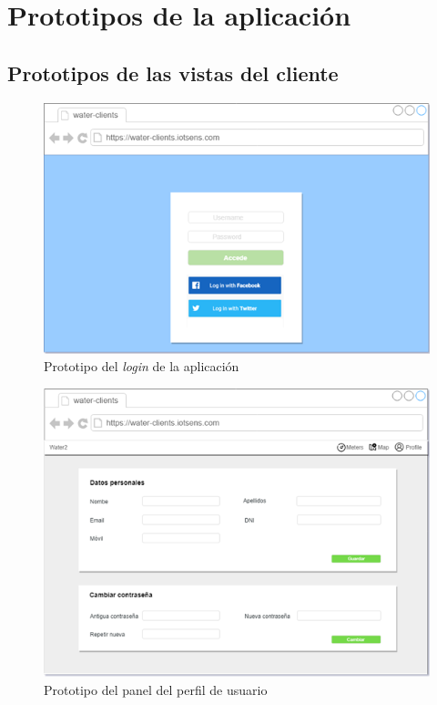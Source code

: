 \documentclass[pdftex,11pt,a4paper]{book}
\begin{document}
\appendix
\renewcommand\appendixname{Anexo}



\chapter{Prototipos de la aplicación}

\section{Prototipos de las vistas del cliente}

\begin{figure}[h]
 \centering
 \includegraphics [scale=1] {images/prototipo/imagen1.png}
 \caption{Prototipo del \textit{login} de la aplicación} \label{fig:prototipo1}
 \end{figure}
 
 \begin{figure}[h]
 \centering
 \includegraphics [scale=1] {images/prototipo/imagen2.png}
 \caption{Prototipo del panel del perfil de usuario} \label{fig:prototipo2}
 \end{figure}
 
\end{document}

